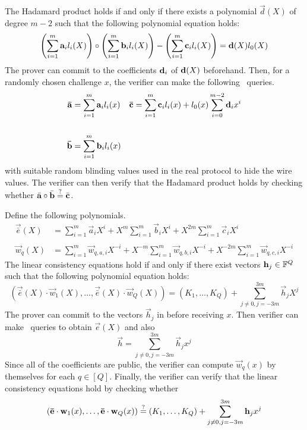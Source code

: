The Hadamard product holds if and only if there exists a polynomial $\vec{d}(X)$ of degree $m-2$ such that the following polynomial equation holds:
\begin{align*}
\left( \sum_{i=1}^m \mathbf{a}_i l_i(X) \right) \circ \left( \sum_{i=1}^m \mathbf{b}_i l_i(X) \right) - \left( \sum_{i=1}^m \mathbf{c}_{i} l_i(X) \right) = \mathbf{d}(X) l_0(X)
\end{align*}
 The prover can commit to the coefficients $\mathbf{d}_i$ of $\mathbf{d}(X)$ beforehand. Then, for a randomly chosen challenge $x$, the verifier can make the following \ILC\ queries.
\begin{align*}
\mathbf{\bar{a}} &= \sum_{i=1}^m \mathbf{a}_{i} l_i(x) && \mathbf{\bar{c}} = \sum_{i=1}^m \mathbf{c}_{i} l_i(x) + l_0(x) \sum_{i=0}^{m-2} \mathbf{d}_i x^i \\ \\
\mathbf{\bar{b}} &= \sum_{i=1}^m \mathbf{b}_{i} l_i(x) &
\end{align*}
with suitable random blinding values used in the real protocol to hide the wire values. The verifier can then verify that the Hadamard product holds by checking whether $\bar{\mathbf{a}} \circ \bar{\mathbf{b}} \overset{?}{=} \bar{\mathbf{c}}$.

Define the following polynomials.
\begin{align*}
\vec{\bar{e}}(X) &= \sum_{i=1}^m \vec{a}_i X^i + X^m \sum_{i=1}^m \vec{b}_{i} X^i + X^{2m} \sum_{i=1}^m \vec{c}_{i} X^i \\ \\
\vec{w}_q(X) &= \sum_{i=1}^m \vec{w}_{q,a,i} X^{-i} + X^{-m} \sum_{i=1}^m \vec{w}_{q,b,i} X^{-i} + X^{-2m} \sum_{i=1}^m \vec{w}_{q,c,i} X^{-i}
\end{align*}
The linear consistency equations hold if and only if there exist vectors $\mathbf{h}_j \in \mathbb{F}^Q$ such that the following polynomial equation holds:
\[
( \vec{\bar{e}}(X) \cdot \vec{w}_1(X),\ldots, \vec{\bar{e}}(X)\cdot \vec{w}_Q(X) )  = (K_1,\ldots,K_Q) + \sum_{j\neq 0, j=-3m}^{3m} \vec{h}_j {X^j}
\]
The prover can commit to the vectors $\vec{h}_j$ in before receiving $x$. Then verifier can make \ILC \ queries to obtain $\vec{e}(X)$ and also
\[
\vec{h} = \sum_{j\neq 0, j=-3m}^{3m} \vec{h}_j {x^j}
\]
Since all of the coefficients are public, the verifier can compute $\vec{w}_q(x)$ by themselves for each $q \in [Q]$. Finally, the verifier can verify that the linear consistency equations hold by checking whether
\[
( \mathbf{\bar{e}}\cdot \mathbf{w}_1(x),\ldots, \mathbf{\bar{e}}\cdot \mathbf{w}_Q(x) ) \overset{?}{=} (K_1,\ldots,K_Q) + \sum_{j\neq 0, j=-3m}^{3m} \mathbf{h}_j {x^j}
\]


